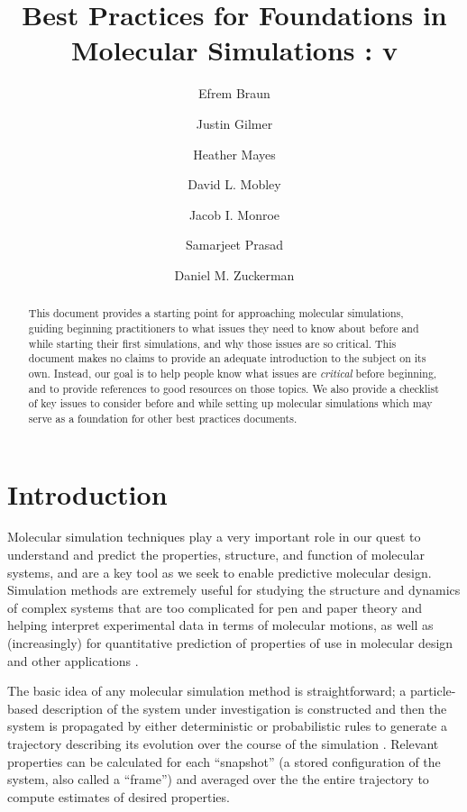 \documentclass[9pt,bestpractices]{livecoms}
\title{Best Practices for Foundations in Molecular Simulations : v\versionnumber}
\author[1]{Efrem Braun}
\author[2]{Justin Gilmer}
\author[3]{Heather Mayes}
\author[4]{David L. Mobley}
\author[5]{Jacob I. Monroe}
\author[6]{Samarjeet Prasad}
\author[7]{Daniel M. Zuckerman}
\affil[1]{University of California, Berkeley}
\affil[2]{Vanderbilt University}
\affil[3]{University of Michigan, Ann Arbor}
\affil[4]{University of California, Irvine}
\affil[5]{University of California, Santa Barbara}
\affil[6]{National Institutes of Health}
\affil[7]{Oregon Health and Science University}
\begin{document}
\begin{frontmatter}
\maketitle

\begin{abstract}
This document provides a starting point for approaching molecular simulations, guiding beginning practitioners to what issues they need to know about before and while starting their first simulations, and why those issues are so critical. 
This document makes no claims to provide an adequate introduction to the subject on its own. 
Instead, our goal is to help people know what issues are \emph{critical} before beginning, and to provide references to good resources on those topics. 
We also provide a checklist of key issues to consider before and while setting up molecular simulations which may serve as a foundation for other best practices documents.
\end{abstract}
\end{frontmatter}


\todototoc
\listoftodos

\section{Introduction}
\label{sec:intro}

Molecular simulation techniques play a very important role in our quest to understand and predict the properties, structure, and function of molecular systems, and are a key tool as we seek to enable predictive molecular design.
Simulation methods are extremely useful for studying the structure and dynamics of complex systems that are too complicated for pen and paper theory and helping interpret experimental data in terms of molecular motions, as well as (increasingly) for quantitative prediction of properties of use in molecular design and other applications \cite{Nussinov2014,Towns2014,Kirchmair2015,Sresht2017,Bottaro2018}.

The basic idea of any molecular simulation method is straightforward; a particle-based description of the system under investigation is constructed and then the system is propagated by either deterministic or probabilistic rules to generate a trajectory describing its evolution over the course of the simulation \cite{Frenkel:2001:,2001Leach}. 
Relevant properties can be calculated for each ``snapshot'' (a stored configuration of the system, also called a ``frame'') and averaged over the the entire trajectory to compute estimates of desired properties.
\end{document}
